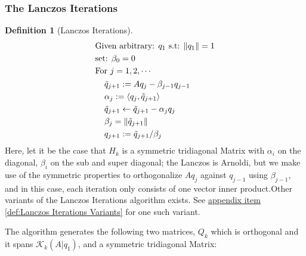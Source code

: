 \documentclass[]{article}
\theoremstyle{definition}
\newtheorem{definition}{Definition}      %
\begin{document}
        \subsubsection{The Lanczos Iterations}
            \begin{definition}[Lanczos Iterations]
                \begin{align}
                    & \text{Given arbitrary: } q_1 \text{ s.t: } \Vert q_1\Vert = 1
                    \\
                    & \text{set: }\beta_0 = 0
                    \\
                    & \text{For } j = 1, 2, \cdots 
                    \\
                    &\hspace{1.1em}\begin{aligned}
                        & \tilde{q}_{j + 1} := Aq_j - \beta_{j - 1}q_{j - 1}
                        \\
                        & \alpha_j := \langle q_j,\tilde{q}_{j + 1}\rangle
                        \\
                        & \tilde{q}_{j + 1} \leftarrow \tilde{q}_{j + 1} - \alpha_j q_j
                        \\
                        & \beta_j = \Vert \tilde{q}_{j + 1}\Vert
                        \\
                        & q_{j + 1} := \tilde{q}_{j + 1}/\beta_j
                    \end{aligned}
                \end{align}
                Here, let it be the case that $H_k$ is a symmetric tridiagonal Matrix with $\alpha_i$ on the diagonal, $\beta_i$ on the sub and super diagonal; the Lanczos is Arnoldi, but we make use of the symmetric properties to orthogonalize $Aq_j$ against $q_{j - 1}$ using $\beta_{j-1}$, and in this case, each iteration only consists of one vector inner product.Other variants of the Lanczos Iterations algorithm exists. See \hyperref[def:Lanczos Iterations Variants]{appendix item \ref*{def:Lanczos Iterations Variants}} for one such variant. 
                
            \end{definition}
            The algorithm generates the following two matrices, $Q_k$ which is orthogonal and it spans $\mathcal K_k(A|q_1)$, and a symmetric tridiagonal Matrix: 
\end{document}
